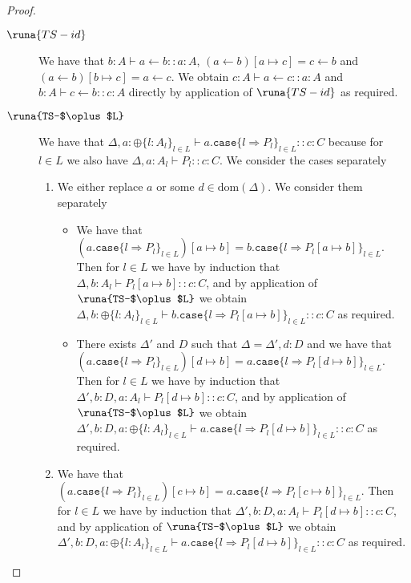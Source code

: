 \begin{lemma}
\begin{proof}
\begin{description}

\item[$\runa{TS-id}$] We have that $b:A\vdash a \leftarrow b :: a\!:\!A$, $(a \leftarrow b)[a\mapsto c]= c \leftarrow b$ and $(a\leftarrow b)[b\mapsto c]=a\leftarrow c$. We obtain $c:A\vdash a\leftarrow c :: a\!:\!A$ and $b:A\vdash c \leftarrow b :: c\!:\!A$ directly by application of $\runa{TS-id}$ as required.

\item[$\runa{TS-$\oplus$L}$] We have that $\Delta,a : \oplus\{l:A_l\}_{l\in L}\vdash a.\texttt{case}\{l\Rightarrow P_l\}_{l\in L} :: c\!:\!C$ because for $l \in L$ we also have $\Delta,a:A_l \vdash P_l :: c\!:\!C$. We consider the cases separately
\begin{enumerate}
    \item We either replace $a$ or some $d\in\text{dom}(\Delta)$. We consider them separately
    \begin{itemize}
        \item We have that $(a.\texttt{case}\{l\Rightarrow P_l\}_{l\in L})[a\mapsto b]=b.\texttt{case}\{l\Rightarrow P_l[a\mapsto b]\}_{l\in L}$. Then for $l\in L$ we have by induction that $\Delta,b:A_l\vdash P_l[a\mapsto b] :: c\!:\!C$, and by application of $\runa{TS-$\oplus$L}$ we obtain $\Delta,b:\oplus\{l:A_l\}_{l\in L}\vdash b.\texttt{case}\{l\Rightarrow P_l[a\mapsto b]\}_{l\in L} :: c\!:\!C$ as required.
        
        \item There exists $\Delta'$ and $D$ such that $\Delta=\Delta',d:D$ and we have that $(a.\texttt{case}\{l\Rightarrow P_l\}_{l\in L})[d\mapsto b]=a.\texttt{case}\{l\Rightarrow P_l[d\mapsto b]\}_{l\in L}$. Then for $l\in L$ we have by induction that $\Delta',b:D,a:A_l\vdash P_l[d\mapsto b] :: c\!:\!C$, and by application of $\runa{TS-$\oplus$L}$ we obtain $\Delta',b:D,a:\oplus\{l:A_l\}_{l\in L}\vdash a.\texttt{case}\{l\Rightarrow P_l[d\mapsto b]\}_{l\in L} :: c\!:\!C$ as required.
    \end{itemize}
    
    \item We have that $(a.\texttt{case}\{l\Rightarrow P_l\}_{l\in L})[c\mapsto b]=a.\texttt{case}\{l\Rightarrow P_l[c\mapsto b]\}_{l\in L}$. Then for $l\in L$ we have by induction that $\Delta',b:D,a:A_l\vdash P_l[d\mapsto b] :: c\!:\!C$, and by application of $\runa{TS-$\oplus$L}$ we obtain $\Delta',b:D,a:\oplus\{l:A_l\}_{l\in L}\vdash a.\texttt{case}\{l\Rightarrow P_l[d\mapsto b]\}_{l\in L} :: c\!:\!C$ as required.
\end{enumerate}


\end{description}
\end{proof}
\end{lemma}

